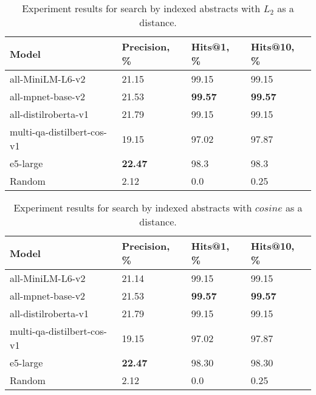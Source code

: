 \begin{table*}[!htbp]
    \small
    \centering
    \caption{Experiment results for search by indexed abstracts with \(L_{2}\) as a distance.}

    \begin{tabularx}{0.99\textwidth}{XIII}

        \toprule

        \bfseries Model & \bfseries Precision, \% & \bfseries Hits@1, \% & \bfseries Hits@10, \% \\

        \midrule
        
        all-MiniLM-L6-v2	        & 21.15 & 99.15	   &	99.15 \\
        all-mpnet-base-v2	        & 21.53 & \textbf{99.57}	   &	\textbf{99.57} \\
        all-distilroberta-v1	    & 21.79 & 99.15	   &	99.15 \\
        multi-qa-distilbert-cos-v1	& 19.15 & 97.02	   &	97.87 \\
        e5-large	                & \textbf{22.47} & 98.3 	   &	98.3 \\
        Random		                & 2.12  &  0.0 	&    0.25 \\

        \bottomrule

    \end{tabularx}

    \label{tab:experiments:abs-l2}
\end{table*}

\begin{table*}[!htbp]
    \small
    \centering
    \caption{Experiment results for search by indexed abstracts with \(cosine\) as a distance.}

    \begin{tabularx}{0.99\textwidth}{XIII}

        \toprule

        \bfseries Model & \bfseries Precision, \% & \bfseries Hits@1, \% & \bfseries Hits@10, \% \\

        \midrule
        
        all-MiniLM-L6-v2	        & 21.14 & 99.15	   &	99.15 \\
        all-mpnet-base-v2	        & 21.53 & \textbf{99.57}	   &	\textbf{99.57} \\
        all-distilroberta-v1	    & 21.79 & 99.15	   &	99.15 \\
        multi-qa-distilbert-cos-v1	& 19.15 & 97.02	   &	97.87 \\
        e5-large	                & \textbf{22.47} & 98.30	   &	98.30 \\
        Random		                & 2.12  &  0.0     &    0.25 \\

        \bottomrule

    \end{tabularx}

    \label{tab:experiments:abs-cos}
\end{table*}

